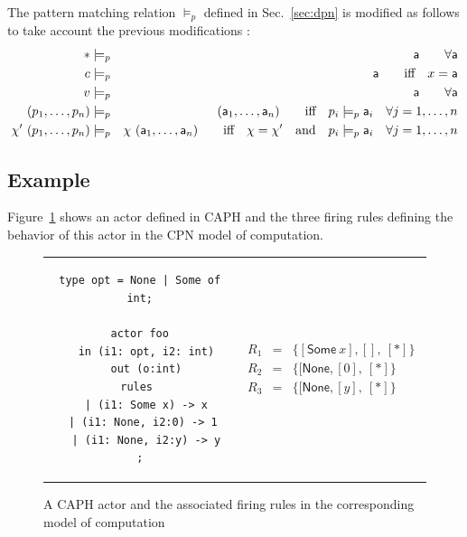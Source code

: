 The pattern matching relation $\models_p$ defined in Sec.~\ref{sec:dpn} is modified as follows
to take account the previous modifications :
\begin{eqnarray*}
* & \models_p & \mathsf{a} \qquad \forall \mathsf{a} \\
c & \models_p & \mathsf{a} \qquad \text{iff}\quad x=\mathsf{a}\\
v & \models_p & \mathsf{a} \qquad \forall \mathsf{a} \\
(p_1,\ldots,p_n) & \models_p & (\mathsf{a}_1,\ldots,\mathsf{a}_n) \qquad \text{iff}\quad p_i \models_p \mathsf{a}_i \quad \forall j=1,\ldots,n \\
\chi'\ (p_1,\ldots,p_n) & \models_p & \chi\ (\mathsf{a}_1,\ldots,\mathsf{a}_n) \qquad \text{iff}\quad \chi = \chi' \quad \text{and} \quad p_i \models_p \mathsf{a}_i \quad \forall j=1,\ldots,n 
\end{eqnarray*}

\subsection{Example}
\label{cpn-example}

Figure~\ref{fig:cpn-ex1} shows an actor defined in CAPH and the three firing rules defining the
behavior of this actor in the CPN model of computation.

\lstset{frame=none}
\begin{figure}[h]
  \centering
\begin{tabular}[c]{cc}
  \begin{minipage}{0.5\textwidth}
\begin{lstlisting}
type opt = None | Some of int;

actor foo
  in (i1: opt, i2: int)
  out (o:int)
rules 
  | (i1: Some x) -> x
  | (i1: None, i2:0) -> 1 
  | (i1: None, i2:y) -> y
;
\end{lstlisting}
  \end{minipage} &
  \begin{minipage}{0.5\textwidth}
\begin{eqnarray*}
  R_1 & = & \{[\mathsf{Some}\ x], [],\ [*]\} \\
  R_2 & = & \{[\mathsf{None}, [0],\ [*]\} \\
  R_3 & = & \{[\mathsf{None}, [y],\ [*]\}
\end{eqnarray*}
  \end{minipage}
\end{tabular}
  \caption{A CAPH actor and the associated firing rules in the corresponding model of computation}
  \label{fig:cpn-ex1}
\end{figure}
\lstset{frame=single}

